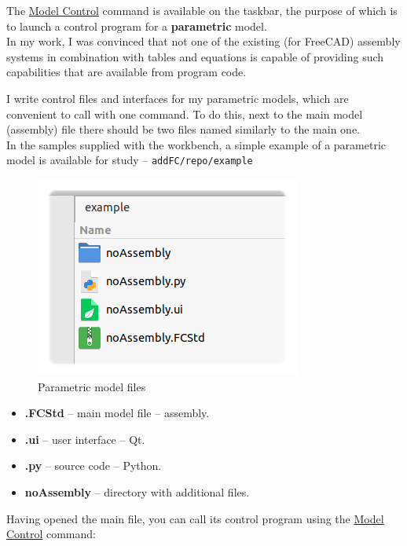 \documentclass[a4paper,12pt]{article}
\begin{document}
The \hyperref[sec:3]{Model Control} command is available on the taskbar, the purpose of which is to launch a control program for a \textbf{parametric} model.\\

In my work, I was convinced that not one of the existing (for FreeCAD) assembly systems in combination with tables and equations is capable of providing such capabilities that are available from program code.

I write control files and interfaces for my parametric models, which are convenient to call with one command. To do this, next to the main model (assembly) file there should be two files named similarly to the main one.\\

In the samples supplied with the workbench, a simple example of a parametric model is available for study -- \verb|addFC/repo/example|

\begin{figure}[htp]
	\centering
	\includegraphics[scale=1]{img/example.png}
	\caption{Parametric model files}
	\label{sec:example}
\end{figure}

\begin{itemize}
	\item \textbf{.FCStd} -- main model file -- assembly.
	\item \textbf{.ui} -- user interface -- Qt.
	\item \textbf{.py} -- source code -- Python.
	\item \textbf{noAssembly} -- directory with additional files.
\end{itemize}

\pagebreak

Having opened the main file, you can call its control program using the \hyperref[sec:3]{Model Control} command:
\end{document}
